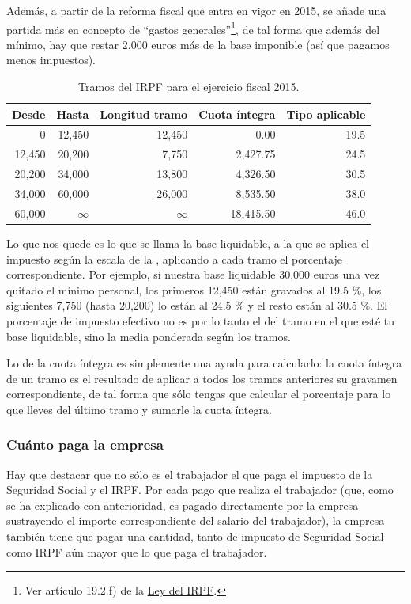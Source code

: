 \documentclass[nochap,palatino,shortheader]{apuntes}
\begin{document}
Además, a partir de la reforma fiscal que entra en vigor en 2015, se añade una partida más en concepto de ``gastos generales''\footnote{Ver artículo 19.2.f) de la \href{https://www.boe.es/buscar/act.php?id=BOE-A-2006-20764&b=29&tn=1&p=20141128}{Ley del IRPF}.}, de tal forma que además del mínimo, hay que restar 2.000 euros más de la base imponible (así que pagamos menos impuestos).

\begin{table}[hbtp]
\centering
\footnotesize
\begin{tabular}{r|r|r|r|r}
\textbf{Desde} & \textbf{Hasta} & \textbf{Longitud tramo} & \textbf{Cuota íntegra} & \textbf{Tipo aplicable} \\ \toprule
0 & 12,450 & 12,450 & 0.00 & 19.5 \\
12,450 & 20,200 & 7,750 & 2,427.75 & 24.5 \\
20,200 & 34,000 & 13,800 & 4,326.50 & 30.5 \\
34,000 & 60,000 & 26,000 & 8,535.50 & 38.0 \\
60,000 & $\infty$ & $\infty$ & 18,415.50 & 46.0 \\
\end{tabular}
\caption{Tramos del IRPF para el ejercicio fiscal 2015.}
\label{tab:Tramos2015IRPF}
\end{table}

Lo que nos quede es lo que se llama la base liquidable, a la que se aplica el impuesto según la escala de la , aplicando a cada tramo el porcentaje correspondiente. Por ejemplo, si nuestra base liquidable 30,000 euros una vez quitado el mínimo personal, los primeros 12,450 están gravados al 19.5 \%, los siguientes 7,750 (hasta 20,200) lo están al 24.5 \% y el resto están al 30.5 \%.
El porcentaje de impuesto efectivo no es por lo tanto el del tramo en el que esté tu base liquidable, sino la media ponderada según los tramos.

Lo de la cuota íntegra es simplemente una ayuda para calcularlo: la cuota íntegra de un tramo es el resultado de aplicar a todos los tramos anteriores su gravamen correspondiente, de tal forma que sólo tengas que calcular el porcentaje para lo que lleves del último tramo y sumarle la cuota íntegra.

\subsubsection{Cuánto paga la empresa}
Hay que destacar que no sólo es el trabajador el que paga el impuesto de la Seguridad Social y el IRPF. Por cada pago que realiza el trabajador (que, como se ha explicado con anterioridad, es pagado directamente por la empresa sustrayendo el importe correspondiente del salario del trabajador), la empresa también tiene que pagar una cantidad, tanto de impuesto de Seguridad Social como IRPF aún mayor que lo que paga el trabajador.
\end{document}
